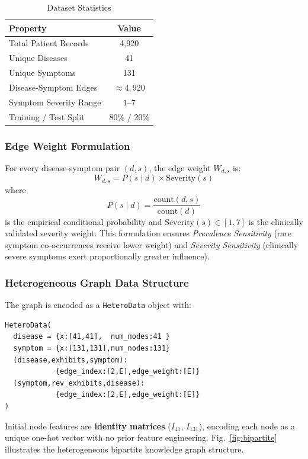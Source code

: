 \documentclass[conference]{IEEEtran}
\begin{document}
\begin{table}[htbp]
  \centering
  \caption{Dataset Statistics}
  \label{tab:dataset}
  \renewcommand{\arraystretch}{1.25}
  \begin{tabular}{lc}
    \toprule
    \textbf{Property} & \textbf{Value} \\
    \midrule
    Total Patient Records       & 4,920     \\
    Unique Diseases             & 41        \\
    Unique Symptoms             & 131       \\
    Disease-Symptom Edges       & $\approx4{,}920$ \\
    Symptom Severity Range      & $1$--$7$  \\
    Training / Test Split       & 80\% / 20\% \\
    \bottomrule
  \end{tabular}
\end{table}

\subsubsection{Edge Weight Formulation}
For every disease-symptom pair $(d,s)$, the edge weight $W_{d,s}$ is:
\begin{equation}
  W_{d,s} = P(s \mid d) \times \mathrm{Severity}(s)
  \label{eq:edgeweight}
\end{equation}
where
\begin{equation}
  P(s \mid d) = \frac{\mathrm{count}(d,s)}{\mathrm{count}(d)}
  \label{eq:prob}
\end{equation}
is the empirical conditional probability and
$\mathrm{Severity}(s)\in[1,7]$ is the clinically validated severity
weight. This formulation ensures \textit{Prevalence Sensitivity}
(rare symptom co-occurrences receive lower weight) and
\textit{Severity Sensitivity} (clinically severe symptoms exert
proportionally greater influence).

\subsubsection{Heterogeneous Graph Data Structure}
The graph is encoded as a \texttt{HeteroData} object with:
\begin{lstlisting}[label={lst:heterodata},
                   caption={HeteroData Graph Specification}]
HeteroData(
  disease = {x:[41,41],  num_nodes:41 }
  symptom = {x:[131,131],num_nodes:131}
  (disease,exhibits,symptom):
            {edge_index:[2,E],edge_weight:[E]}
  (symptom,rev_exhibits,disease):
            {edge_index:[2,E],edge_weight:[E]}
)
\end{lstlisting}
Initial node features are \textbf{identity matrices}
($I_{41}$, $I_{131}$), encoding each node as a unique one-hot vector
with no prior feature engineering. Fig.~\ref{fig:bipartite}
illustrates the heterogeneous bipartite knowledge graph structure.
\end{document}
